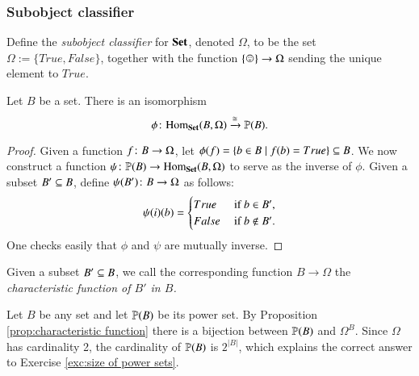 
\subsubsection{Subobject classifier}

\begin{definition}\label{def:subobject classifier}

Define the {\em subobject classifier} for $\Set$, denoted $\Omega$, to be the set $\Omega:=\{True,False\}$, together with the function $\singleton\to\Omega$ sending the unique element to $True$.

\end{definition}


\begin{proposition}\label{prop:characteristic function}

Let $B$ be a set. There is an isomorphism $$\phi\taking\Hom_\Set(B,\Omega)\To{\iso}\PP(B).$$

\end{proposition}

\begin{proof}

Given a function $f\taking B\to\Omega$, let $\phi(f)=\{b\in B\|f(b)=True\}\ss B$. We now construct a function $\psi\taking\PP(B)\to\Hom_\Set(B,\Omega)$ to serve as the inverse of $\phi$. Given a subset $B'\ss B$, define $\psi(B')\taking B\to\Omega$ as follows: 
$$\psi(i)(b)=\begin{cases}
True&\tn{ if } b\in B',\\
False&\tn{ if } b\not\in B'.
\end{cases}
$$
One checks easily that $\phi$ and $\psi$ are mutually inverse.

\end{proof}

\begin{definition}

Given a subset $B'\ss B$, we call the corresponding function $B\to\Omega$ the {\em characteristic function of $B'$ in $B$.}

\end{definition}

Let $B$ be any set and let $\PP(B)$ be its power set. By Proposition \ref{prop:characteristic function} there is a bijection between $\PP(B)$ and $\Omega^B$. Since $\Omega$ has cardinality 2, the cardinality of $\PP(B)$ is $2^{|B|}$, which explains the correct answer to Exercise \ref{exc:size of power sets}.

